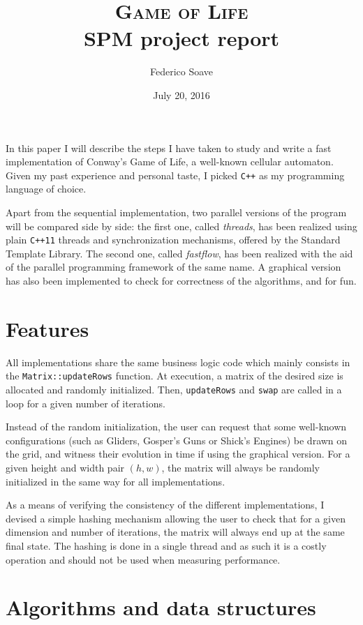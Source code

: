 \documentclass[a4paper,11pt]{article}
\newcommand{\code}[1]{\texttt{#1}}
\begin{document}
\author{Federico Soave}
\date{July 20, 2016}
\title{{\huge\scshape Game of Life} \\ {\large SPM project report}}
\maketitle

In this paper I will describe the steps I have taken to study and write a fast implementation of Conway's Game of Life, a well-known cellular automaton. Given my past experience and personal taste, I picked \code{C++} as my programming language of choice.

Apart from the sequential implementation, two parallel versions of the program will be compared side by side: the first one, called \emph{threads}, has been realized using plain \code{C++11} threads and synchronization mechanisms, offered by the Standard Template Library. The second one, called \emph{fastflow}, has been realized with the aid of the parallel programming framework of the same name. A graphical version has also been implemented to check for correctness of the algorithms, and for fun.

\section{Features}

All implementations share the same business logic code which mainly consists in the \code{Matrix::updateRows} function. At execution, a matrix of the desired size is allocated and randomly initialized. Then, \code{updateRows} and \code{swap} are called in a loop for a given number of iterations.

Instead of the random initialization, the user can request that some well-known configurations (such as Gliders, Gosper's Guns or Shick's Engines) be drawn on the grid, and witness their evolution in time if using the graphical version. For a given height and width pair $(h,w)$, the matrix will always be randomly initialized in the same way for all implementations.

As a means of verifying the consistency of the different implementations, I devised a simple hashing mechanism allowing the user to check that for a given dimension and number of iterations, the matrix will always end up at the same final state. The hashing is done in a single thread and as such it is a costly operation and should not be used when measuring performance.

\section{Algorithms and data structures}
\end{document}
